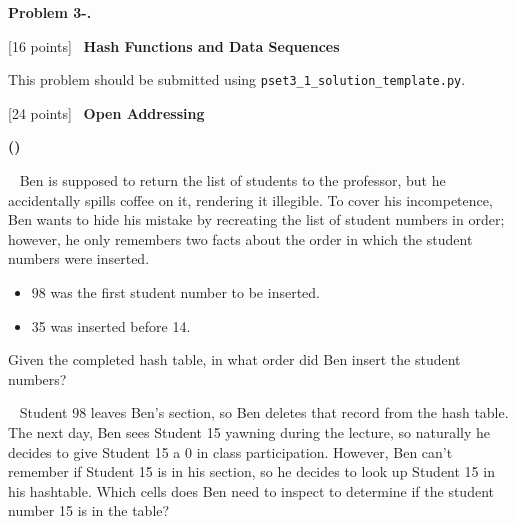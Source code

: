 \documentclass[12pt,oneside]{article}
\makeatletter
\newcounter{problemnum}
\newcommand{\theproblem}{Problem \theproblemsetnum-\arabic{problemnum}}
\newenvironment{problems}{
        \begin{list}{{\bf \theproblem. \hspace*{0.5em}}}
        {\setlength{\leftmargin}{0em}
         \setlength{\rightmargin}{0em}
         \setlength{\labelwidth}{0em}
         \setlength{\labelsep}{0em}
         \usecounter{problemnum}}}{\end{list}}
\newcommand{\problem}[1][{}]{\item \let\@currentlabel=\theproblem \textbf{#1}}
\newcounter{problempartnum}[problemnum]
\newenvironment{problemparts}{
        \begin{list}{{\bf (\alph{problempartnum})}}
        {\setlength{\leftmargin}{2.5em}
         \setlength{\rightmargin}{2.5em}
         \setlength{\labelsep}{0.5em}}}{\end{list}}
\newcommand{\problempart}{\addtocounter{problempartnum}{1}\item}
\newcommand{\points}[1]{[#1 points]\ }
\newcommand{\theproblemsetnum}{3}
\makeatother
\begin{document}
\begin{problems}

\newpage
\problem \points{16} \textbf{Hash Functions and Data Sequences}

This problem should be submitted using {\tt pset3\_1\_solution\_template.py}.

\problem \points{24} \textbf{Open Addressing}

\begin{problemparts}
\problempart \points{5}  Ben is supposed to return the list of students to the professor, but he accidentally spills coffee on it, rendering it illegible.  To cover his incompetence, Ben wants to hide his mistake by recreating the list of student numbers in order; however, he only remembers two facts about the order in which the student numbers were inserted.

\begin{itemize}
\item 98 was the first student number to be inserted.
\item 35 was inserted before 14.
\end{itemize}

Given the completed hash table, in what order did Ben insert the student numbers?


\problempart \points{5}  Student 98 leaves Ben's section, so Ben deletes that record from the hash table.  The next day, Ben sees Student 15 yawning during the lecture, so naturally he decides to give Student 15 a 0 in class participation.  However, Ben can't remember if Student 15 is in his section, so he decides to look up Student 15 in his hashtable.  Which cells does Ben need to inspect to determine if the student number 15 is in the table?


\end{problemparts}
\end{problems}
\end{document}
